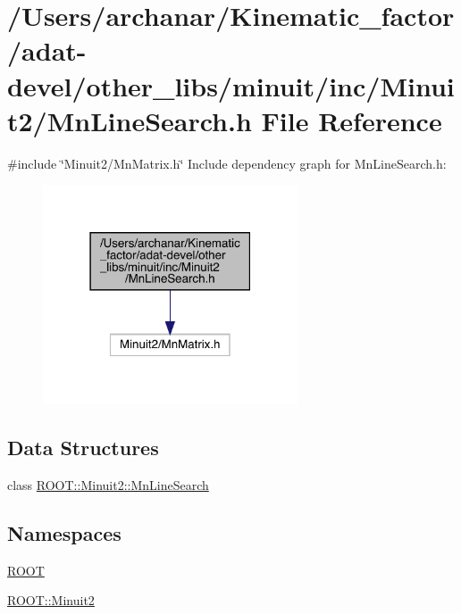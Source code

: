 \hypertarget{adat-devel_2other__libs_2minuit_2inc_2Minuit2_2MnLineSearch_8h}{}\section{/\+Users/archanar/\+Kinematic\+\_\+factor/adat-\/devel/other\+\_\+libs/minuit/inc/\+Minuit2/\+Mn\+Line\+Search.h File Reference}
\label{adat-devel_2other__libs_2minuit_2inc_2Minuit2_2MnLineSearch_8h}
{\ttfamily \#include \char`\"{}Minuit2/\+Mn\+Matrix.\+h\char`\"{}}\newline
Include dependency graph for Mn\+Line\+Search.\+h\+:
\nopagebreak
\begin{figure}[H]
\begin{center}
\leavevmode
\includegraphics[width=214pt]{d0/dd4/adat-devel_2other__libs_2minuit_2inc_2Minuit2_2MnLineSearch_8h__incl}
\end{center}
\end{figure}
\subsection*{Data Structures}
\begin{DoxyCompactItemize}
\item 
class \mbox{\hyperlink{classROOT_1_1Minuit2_1_1MnLineSearch}{R\+O\+O\+T\+::\+Minuit2\+::\+Mn\+Line\+Search}}
\end{DoxyCompactItemize}
\subsection*{Namespaces}
\begin{DoxyCompactItemize}
\item 
 \mbox{\hyperlink{namespaceROOT}{R\+O\+OT}}
\item 
 \mbox{\hyperlink{namespaceROOT_1_1Minuit2}{R\+O\+O\+T\+::\+Minuit2}}
\end{DoxyCompactItemize}
